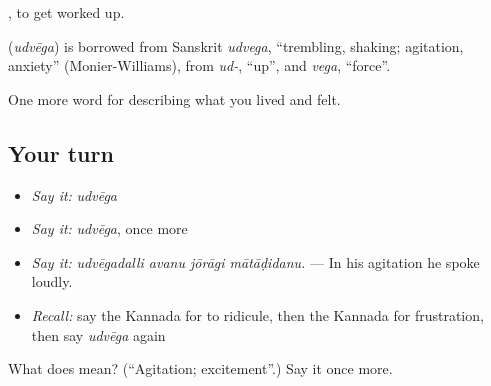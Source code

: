  , to get worked up.

\begin{cousinweb}
\textbf{} (\emph{udvēga}) is borrowed from Sanskrit \emph{udvega}, \textquotedblleft{}trembling, shaking; agitation, anxiety\textquotedblright{} (Monier-Williams), from \emph{ud-}, \textquotedblleft{}up\textquotedblright{}, and \emph{vega}, \textquotedblleft{}force\textquotedblright{}.
\end{cousinweb}

\begin{grammarlens}[title={What you've built}]
One more word for describing what you lived and felt.
\end{grammarlens}

\subsection*{Your turn}
\begin{itemize}
\raggedright
  \item \emph{Say it:} \emph{udvēga}
  \item \emph{Say it:} \emph{udvēga}, once more
  \item \emph{Say it:} \emph{udvēgadalli avanu jōrāgi mātāḍidanu.} — In his agitation he spoke loudly.
  \item \emph{Recall:} say the Kannada for to ridicule, then the Kannada for frustration, then say \emph{udvēga} again
\end{itemize}

\begin{tcolorbox}[breakable,colback=teal!4,colframe=teal!35!black,title={Before you move on}]
What does  mean? (\textquotedblleft{}Agitation; excitement\textquotedblright{}.) Say it once more.
\end{tcolorbox}
